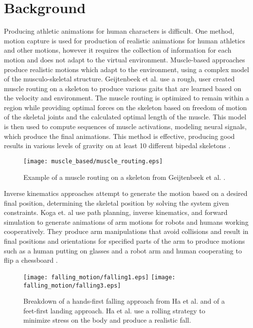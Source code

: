 \documentclass[landscape,26pt]{sciposter}
\begin{document}
\begin{minipage}[t]{17in}
	\section*{Background}
		Producing athletic animations for human characters is difficult.  One method, motion capture is used for production of realistic animations for human athletics and other motions, however it requires the collection of information for each motion and does not adapt to the virtual environment.  Muscle-based approaches produce realistic motions which adapt to the environment, using a complex model of the musculo-skeletal structure.  Geijtenbeek et al. use a rough, user created muscle routing on a skeleton to produce various gaits that are learned based on the velocity and environment.  The muscle routing is optimized to remain within a region while providing optimal forces on the skeleton based on freedom of motion of the skeletal joints and the calculated optimal length of the muscle.  This model is then used to compute sequences of muscle activations, modeling neural signals, which produce the final animations.  This method is effective, producing good results in various levels of gravity on at least 10 different bipedal skeletons \cite{muscle_based_bipeds}.

		\begin{figure}
			\centering
			\texttt{[image: muscle\_based/muscle\_routing.eps]}
			\caption{Example of a muscle routing on a skeleton from Geijtenbeek et al. \cite{muscle_based_bipeds}.}
		\end{figure}
		
		Inverse kinematics approaches attempt to generate the motion based on a desired final position, determining the skeletal position by solving the system given constraints.  Koga et. al use path planning, inverse kinematics, and forward simulation to generate animations of arm motions for robots and humans working cooperatively.  They produce arm manipulations that avoid collisions and result in final positions and orientations for specified parts of the arm to produce motions such as a human putting on glasses and a robot arm and human cooperating to flip a chessboard \cite{motion_intentions}.  
		
		\begin{figure}
			\centering
			\texttt{[image: falling\_motion/falling1.eps]}
			\hspace{0.1\columnwidth}
			\texttt{[image: falling\_motion/falling3.eps]}
			\caption{Breakdown of a hands-first falling approach from Ha et al. \cite{falling_landing} and of a feet-first landing approach.  Ha et al. use a rolling strategy to minimize stress on the body and produce a realistic fall.}
		\end{figure}
		

\end{minipage}
\end{document}
